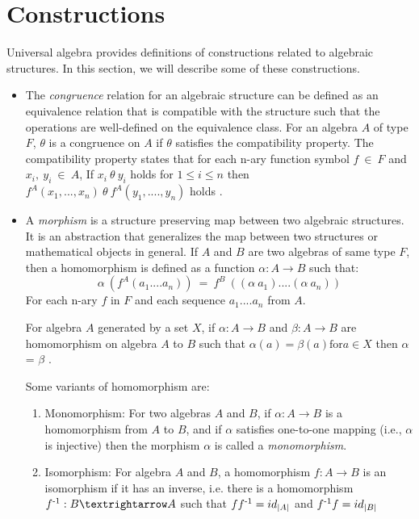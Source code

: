 \section{Constructions}
Universal algebra provides definitions of constructions related to algebraic
structures. In this section, we will describe some of these constructions. 
\begin{itemize}
    \item The \textit{congruence} relation for an algebraic structure can be
    defined as an equivalence relation that is compatible with the structure
    such that the operations are well-defined on the equivalence class. For an
    algebra $A$ of type $F$, $\theta$ is a congruence on $A$ if $\theta$
    satisfies the compatibility property. The compatibility property states that
    for each n-ary function symbol $f \ \in\ F$ and $x_i,\ y_i\ \in\ A$, If
    $x_i\ \theta\ y_i$ holds for \(1\leq i \leq n\) then $f^{A}(x_1,...,x_n)\
    \theta\ f^{A}(y_1,....,y_n)$ holds \cite{sankappanavar1981course}.

    \item A \textit{morphism} is a structure preserving map between two
    algebraic structures. It is an abstraction that generalizes the map between
    two structures or mathematical objects in general. If $A$ and $B$ are two
    algebras of same type $F$, then a homomorphism is defined as a function
    $\alpha: A \rightarrow B$ such that: \[ \alpha\ (f^{A}(a_1....a_n))\ =\
    f^{B}\ ((\alpha\ a_1)....(\alpha\ a_n))\] For each n-ary $f$ in $F$ and
    each sequence $a_1....a_n$ from $A$.
   
    For algebra $A$ generated by a set $X$, if \(\alpha: A \rightarrow B\) and
    \(\beta: A \rightarrow B\) are homomorphism on algebra $A$ to $B$ such that
    \(\alpha (a) = \beta (a) \text{for} a \in X\) then \(\alpha\) = \(\beta\)
    \cite{sankappanavar1981course}.

    Some variants of homomorphism are:
    \begin{enumerate}
        \item  Monomorphism: For two algebras $A$ and $B$, if \(\alpha : A
        \rightarrow B \) is a homomorphism from $A$ to $B$, and if \(\alpha\)
        satisfies one-to-one mapping (i.e., \(\alpha\) is injective) then the
        morphism \(\alpha\) is called a \textit{monomorphism}.

        \item Isomorphism: For algebra $A$ and $B$, a homomorphism $f:A → B$ is
        an isomorphism if it has an inverse, i.e. there is a homomorphism
        $f\textsuperscript{-1}:B → A$ such that $ff\textsuperscript{-1} =
        id_{|A|}$ and $f\textsuperscript{-1}f = id_{|B|}$ 


\end{enumerate}
\end{itemize}
